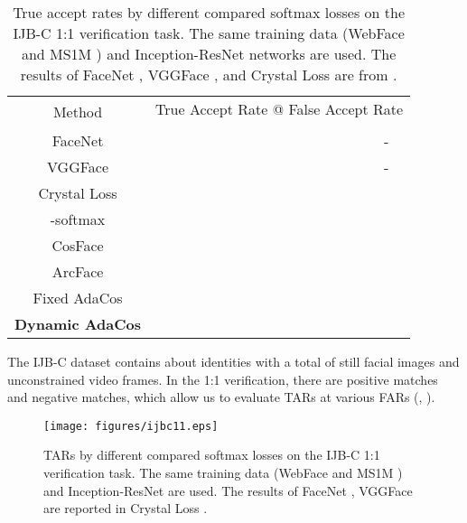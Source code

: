 \documentclass[10pt,twocolumn,letterpaper]{article}
\begin{document}
\begin{table*}
\begin{center}
\begin{tabular}{|c||c|c|c|c|c|c|c|}

\hline
    \multirow{2}{*}{Method} & \multicolumn{7}{c|}{True Accept Rate @ False Accept Rate} \\
\cline{2-8}&&&&&&&\\
    \hline\hline  
FaceNet \cite{FaceNet}&  &  &  &  &  & &-\\

VGGFace \cite{parkhi2015deep}&  &  &  &  &  & &-\\

Crystal Loss \cite{ranjan2018crystal}&  &  &  &  &  & &\\
    \hline
    
-softmax&  &  &  &  &  &  & \\

CosFace \cite{CosFace}&  &  &  &  &  &  & \\
    
ArcFace \cite{ArcFace}&  &  &  &  &  &  & \\

    \hline
 Fixed AdaCos&  &  &  &  &  &  & \\
    {\bf Dynamic AdaCos} &  &  &  &  &  &  &  \\
    
\hline
\end{tabular}
\end{center}
\caption{ True accept rates by different compared softmax losses on the IJB-C 1:1 verification task. The same training data (WebFace \cite{WebFace} and MS1M \cite{MS-Celeb-1M}) and Inception-ResNet \cite{IR} networks are used. The results of FaceNet \cite{FaceNet}, VGGFace \cite{parkhi2015deep}, and Crystal Loss \cite{ranjan2018crystal} are from \cite{ranjan2018crystal}.}
\label{tab:ijbc11_benchmark}

\end{table*}
The IJB-C dataset \cite{ijbc} contains about  identities with a total of  still facial images and  unconstrained video frames. In the 1:1 verification, there are  positive matches and  negative matches, which allow us to evaluate TARs at various FARs (\eg, ).


\begin{figure}[t]
\begin{center}
\texttt{[image: figures/ijbc11.eps]}
\end{center}
   \caption{TARs by different compared softmax losses on the IJB-C 1:1 verification task. The same training data (WebFace \cite{WebFace} and MS1M \cite{MS-Celeb-1M}) and Inception-ResNet \cite{IR} are used. The results of FaceNet \cite{FaceNet}, VGGFace \cite{parkhi2015deep} are reported in Crystal Loss \cite{ranjan2018crystal}.}
\label{fig:ijbc11}

\end{figure}
\end{document}
